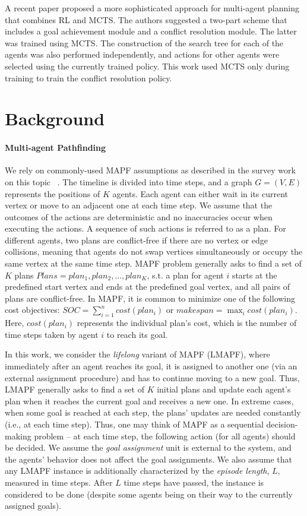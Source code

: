 \documentclass[letterpaper]{article} %
\begin{document}
A recent paper \cite{skrynnik2021hybrid} proposed a more sophisticated approach for multi-agent planning that combines RL and MCTS. The authors suggested a two-part scheme that includes a goal achievement module and a conflict resolution module. The latter was trained using MCTS. The construction of the search tree for each of the agents was also performed independently, and actions for other agents were selected using the currently trained policy. This work used MCTS only during training to train the conflict resolution policy.

\section{Background}

\paragraph{Multi-agent Pathfinding} We rely on commonly-used MAPF assumptions as described in the survey work on this topic~ \cite{stern2019multi}. The timeline is divided into time steps, and a graph $G=(V, E)$ represents the positions of $K$ agents. Each agent can either wait in its current vertex or move to an adjacent one at each time step. We assume that the outcomes of the actions are deterministic and no inaccuracies occur when executing the actions. A sequence of such actions is referred to as a plan. For different agents, two plans are conflict-free if there are no vertex or edge collisions, meaning that agents do not swap vertices simultaneously or occupy the same vertex at the same time step. MAPF problem generally asks to find a set of $K$ plans $Plans={plan_1, plan_2, ..., plan_K}$, s.t. a plan for agent $i$ starts at the predefined start vertex and ends at the predefined goal vertex, and all pairs of plans are conflict-free. In MAPF, it is common to minimize one of the following cost objectives: $SOC=\sum_{i=1}^n cost(plan_i)$ or $makespan = \max_i cost(plan_i)$. Here, $cost(plan_i)$ represents the individual plan's cost, which is the number of time steps taken by agent $i$ to reach its goal.

In this work, we consider the \textit{lifelong} variant of MAPF (LMAPF), where immediately after an agent reaches its goal, it is assigned to another one (via an external assignment procedure) and has to continue moving to a new goal. Thus, LMAPF generally asks to find a set of $K$ initial plans and update each agent’s plan when it reaches the current goal and receives a new one. In extreme cases, when some goal is reached at each step, the plans’ updates are needed constantly (i.e., at each time step). Thus, one may think of MAPF as a sequential decision-making problem -- at each time step, the following action (for all agents) should be decided. We assume the \emph{goal assignment} unit is external to the system, and the agents' behavior does not affect the goal assignments. We also assume that any LMAPF instance is additionally characterized by the \emph{episode length}, $L$, measured in time steps. After $L$ time steps have passed, the instance is considered to be done (despite some agents being on their way to the currently assigned goals).
\end{document}
